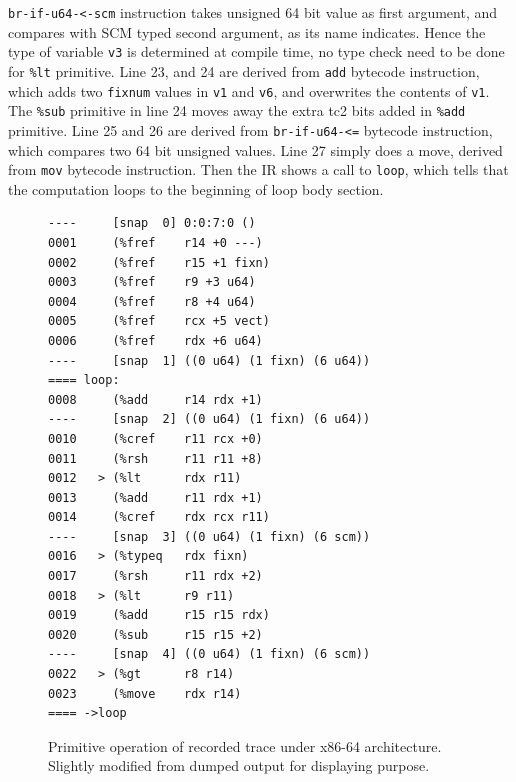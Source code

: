 \documentclass[preprint]{sigplanconf}
\begin{document}
\texttt{br-if-u64-<-scm} instruction takes unsigned 64 bit value as first
argument, and compares with SCM typed second argument, as its name indicates.
Hence the type of variable \texttt{v3} is determined at compile time, no type
check need to be done for \texttt{\%lt} primitive. Line 23, and 24 are derived
from \texttt{add} bytecode instruction, which adds two \texttt{fixnum} values
in \texttt{v1} and \texttt{v6}, and overwrites the contents of
\texttt{v1}. The \texttt{\%sub} primitive in line 24 moves away the extra tc2
bits added in \texttt{\%add} primitive. Line 25 and 26 are derived from
\texttt{br-if-u64-<=} bytecode instruction, which compares two 64 bit unsigned
values. Line 27 simply does a move, derived from \texttt{mov} bytecode
instruction. Then the IR shows a call to \texttt{loop}, which tells that the
computation loops to the beginning of loop body section.

\begin{figure}
\begin{verbatim}
----     [snap  0] 0:0:7:0 ()
0001     (%fref    r14 +0 ---)
0002     (%fref    r15 +1 fixn)
0003     (%fref    r9 +3 u64)
0004     (%fref    r8 +4 u64)
0005     (%fref    rcx +5 vect)
0006     (%fref    rdx +6 u64)
----     [snap  1] ((0 u64) (1 fixn) (6 u64))
==== loop:
0008     (%add     r14 rdx +1)
----     [snap  2] ((0 u64) (1 fixn) (6 u64))
0010     (%cref    r11 rcx +0)
0011     (%rsh     r11 r11 +8)
0012   > (%lt      rdx r11)
0013     (%add     r11 rdx +1)
0014     (%cref    rdx rcx r11)
----     [snap  3] ((0 u64) (1 fixn) (6 scm))
0016   > (%typeq   rdx fixn)
0017     (%rsh     r11 rdx +2)
0018   > (%lt      r9 r11)
0019     (%add     r15 r15 rdx)
0020     (%sub     r15 r15 +2)
----     [snap  4] ((0 u64) (1 fixn) (6 scm))
0022   > (%gt      r8 r14)
0023     (%move    rdx r14)
==== ->loop
\end{verbatim}
\caption{Primitive operation of recorded trace under x86-64
  architecture. Slightly modified from dumped output for displaying purpose.}
\label{fig:primops}
\end{figure}
\end{document}
